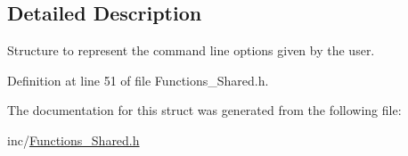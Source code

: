 \subsection{Detailed Description}
Structure to represent the command line options given by the user. 

Definition at line 51 of file Functions\+\_\+\+Shared.\+h.



The documentation for this struct was generated from the following file\+:\begin{DoxyCompactItemize}
\item 
inc/\hyperlink{Functions__Shared_8h}{Functions\+\_\+\+Shared.\+h}\end{DoxyCompactItemize}
